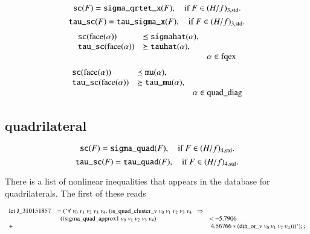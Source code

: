 %
\begin{equation}
    {\operatorname{{\texttt{sc}}}}(F) = {\operatorname{{\texttt{sigma\_qrtet\_x}}}}(F),\quad\text{if } F\in
    (H/f)_{3,{\operatorname{std}}}.
\end{equation}
%
\begin{equation}
        {\operatorname{{\texttt{tau\_sc}}}}(F) =
        {\operatorname{{\texttt{tau\_sigma\_x}}}}(F),\quad\text{if } F\in
        (H/f)_{3,{\operatorname{std}}}.
\end{equation}
%
\begin{equation}
    \begin{array}{lll}
    {\operatorname{{\texttt{sc}}}}({\operatorname{face}}(\alpha)) &\preceq {\operatorname{{\texttt{sigmahat}}}}(\alpha),\\
    {\operatorname{{\texttt{tau\_sc}}}}({\operatorname{face}}(\alpha)) &\succeq {\operatorname{{\texttt{tauhat}}}}(\alpha),\\
    &&\alpha\in {\operatorname{fqex}}
    \end{array}
\end{equation}
%
\begin{equation}
    \begin{array}{lll}
    {\operatorname{{\texttt{sc}}}}({\operatorname{face}}(\alpha)) &\preceq {\operatorname{{\texttt{mu}}}}(\alpha),\\
    {\operatorname{{\texttt{tau\_sc}}}}({\operatorname{face}}(\alpha)) &\succeq {\operatorname{{\texttt{tau\_mu}}}}(\alpha),\\
    &&\alpha\in {\operatorname{quad\_diag}}
    \end{array}
\end{equation}






\subsection{quadrilateral}

\begin{equation}
 {\operatorname{{\texttt{sc}}}}(F) = {\operatorname{{\texttt{sigma\_quad}}}}(F),\quad\text{if } F\in
    (H/f)_{4,{\operatorname{std}}}.
\end{equation}
%
\begin{equation}
 {\operatorname{{\texttt{tau\_sc}}}}(F) = {\operatorname{{\texttt{tau\_quad}}}}(F),\quad\text{if } F\in
    (H/f)_{4,{\operatorname{std}}}.
\end{equation}
%

There is a list of nonlinear inequalities that appears in the
database for quadrilaterals.  The first of these reads



\begin{equation}
\label{eqn:exdih}
\begin{array}{lll} \op{let}\ \op{J\_310151857} &= (`\forall\ v_0\ v_1\ v_2\ v_3\ v_4.\
  (\op{is\_quad\_cluster\_v}\ v_0\ v_1\ v_2\ v_3\ v_4\ \ \Rightarrow\\
        &\ \ ((\op{sigma\_quad\_approx1}\ v_0\ v_1\ v_2\ v_3\ v_4) &<
        -5.7906\\
                + &&\ 4.56766*(\op{dih\_or\_v}\ v_0\ v_1\ v_2\ v_4)))`);;
\end{array}
\end{equation}

